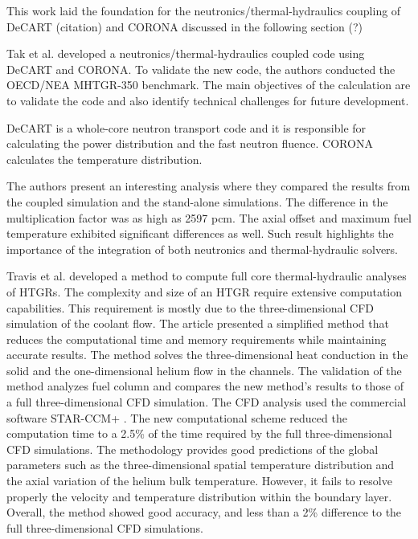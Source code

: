 \documentclass[11pt,letterpaper]{article}
\begin{document}
This work laid the foundation for the neutronics/thermal-hydraulics coupling of DeCART (citation) and CORONA discussed in the following section (?)

Tak et al. \cite{tak_coupled_2016} developed a neutronics/thermal-hydraulics coupled code using DeCART \cite{kaeri_decart_2007} and CORONA.
To validate the new code, the authors conducted the OECD/NEA MHTGR-350 benchmark.
The main objectives of the calculation are to validate the code and also identify technical challenges for future development.

DeCART is a whole-core neutron transport code and it is responsible for calculating the power distribution and the fast neutron fluence.
CORONA calculates the temperature distribution.

The authors present an interesting analysis where they compared the results from the coupled simulation and the stand-alone simulations.
The difference in the multiplication factor was as high as 2597 pcm.
The axial offset and maximum fuel temperature exhibited significant differences as well.
Such result highlights the importance of the integration of both neutronics and thermal-hydraulic solvers.

Travis et al. \cite{travis_thermalhydraulics_2013} developed a method to compute full core thermal-hydraulic analyses of \glspl{HTGR}.
The complexity and size of an \gls{HTGR} require extensive computation capabilities.
This requirement is mostly due to the three-dimensional CFD simulation of the coolant flow.
The article presented a simplified method that reduces the computational time and memory requirements while maintaining accurate results.
The method solves the three-dimensional heat conduction in the solid and the one-dimensional helium flow in the channels.
The validation of the method analyzes fuel column and compares the new method's results to those of a full three-dimensional CFD simulation.
The CFD analysis used the commercial software STAR-CCM+ \cite{cd-adapco_star-ccm_2012}.
The new computational scheme reduced the computation time to a 2.5\% of the time required by the full three-dimensional CFD simulations.
The methodology provides good predictions of the global parameters such as the three-dimensional spatial temperature distribution and the axial variation of the helium bulk temperature.
However, it fails to resolve properly the velocity and temperature distribution within the boundary layer.
Overall, the method showed good accuracy, and less than a 2\% difference to the full three-dimensional CFD simulations.
\end{document}
